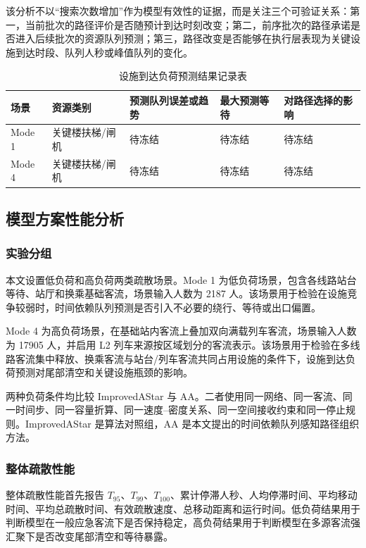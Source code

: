 \documentclass[UTF8,a4paper,12pt]{ctexart}
\begin{document}
该分析不以“搜索次数增加”作为模型有效性的证据，而是关注三个可验证关系：第一，当前批次的路径评价是否随预计到达时刻改变；第二，前序批次的路径承诺是否进入后续批次的资源队列预测；第三，路径改变是否能够在执行层表现为关键设施到达时段、队列人秒或峰值队列的变化。

\begin{table}[htbp]
\centering
\caption{设施到达负荷预测结果记录表}
\small
\begin{tabular}{p{}p{}p{}p{}p{}}
\toprule
场景 & 资源类别 & 预测队列误差或趋势 & 最大预测等待 & 对路径选择的影响 \\
\midrule
Mode 1 & 关键楼扶梯/闸机 & 待冻结 & 待冻结 & 待冻结 \\
Mode 4 & 关键楼扶梯/闸机 & 待冻结 & 待冻结 & 待冻结 \\
\bottomrule
\end{tabular}
\end{table}

\subsection{模型方案性能分析}

\subsubsection{实验分组}

本文设置低负荷和高负荷两类疏散场景。Mode 1 为低负荷场景，包含各线路站台等待、站厅和换乘基础客流，场景输入人数为 2187 人。该场景用于检验在设施竞争较弱时，时间依赖队列预测是否引入不必要的绕行、等待或出口偏置。

Mode 4 为高负荷场景，在基础站内客流上叠加双向满载列车客流，场景输入人数为 17905 人，并启用 L2 列车来源按区域划分的客流表示。该场景用于检验在多线路客流集中释放、换乘客流与站台/列车客流共同占用设施的条件下，设施到达负荷预测对尾部清空和关键设施瓶颈的影响。

两种负荷条件均比较 ImprovedAStar 与 AA。二者使用同一网络、同一客流、同一时间步、同一容量折算、同一速度--密度关系、同一空间接收约束和同一停止规则。ImprovedAStar 是算法对照组，AA 是本文提出的时间依赖队列感知路径组织方法。

\subsubsection{整体疏散性能}

整体疏散性能首先报告 \(T_{95}\)、\(T_{99}\)、\(T_{100}\)、累计停滞人秒、人均停滞时间、平均移动时间、平均总疏散时间、有效疏散速度、总移动距离和运行时间。低负荷结果用于判断模型在一般应急客流下是否保持稳定，高负荷结果用于判断模型在多源客流强汇聚下是否改变尾部清空和等待暴露。
\end{document}
